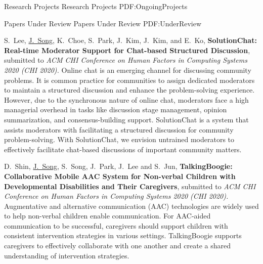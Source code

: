 \documentclass[letterpaper,MMMyyyy,nonstopmode]{template}
\begin{document}
\begin{Body}
\endgroup

\newpage


\BigGap
\Section
{Research Projects}
{Research Projects}
{PDF:OngoingProjects}

\SubSection
{Papers Under Review}
{Papers Under Review}
{PDF:UnderReview}

\begingroup
\renewcommand{\MaxNumberedItem}{[88]}

\BigGap
\NumberedItem{[3]}
  S.~Lee, \underline{J.~Song}, K.~Choe, S.~Park, J.~Kim, J.~Kim, and E.~Ko,
  \textbf{SolutionChat: Real-time Moderator Support for Chat-based Structured Discussion},
  submitted to \textit{ACM CHI Conference on Human Factors in Computing Systems 2020 (CHI 2020).}
  \vspace{2mm}\newline
  {\small{
    Online chat is an emerging channel for discussing community problems. It is common practice for communities to assign dedicated moderators to maintain a structured discussion and enhance the problem-solving experience. However, due to the synchronous nature of online chat, moderators face a high managerial overhead in tasks like discussion stage management, opinion summarization, and consensus-building support. SolutionChat is a system that assists moderators with facilitating a structured discussion for community problem-solving.
    With SolutionChat, we envision untrained moderators to effectively facilitate chat-based discussions of important community matters.
  }}


\BigGap
\NumberedItem{[4]}
  D.~Shin, \underline{J.~Song}, S.~Song, J.~Park, J.~Lee and S.~Jun,
  \textbf{TalkingBoogie: Collaborative Mobile AAC System for Non-verbal Children with Developmental Disabilities and Their Caregivers},
  submitted to \textit{ACM CHI Conference on Human Factors in Computing Systems 2020 (CHI 2020).}
  \vspace{2mm}\newline
  {\small{
    Augmentative and alternative communication (AAC) technologies are widely used to help non-verbal children enable communication. For AAC-aided communication to be successful, caregivers should support children with consistent intervention strategies in various settings. TalkingBoogie supports caregivers to effectively collaborate with one another and create a shared understanding of intervention strategies.
  }}


\end{Body}
\end{document}
